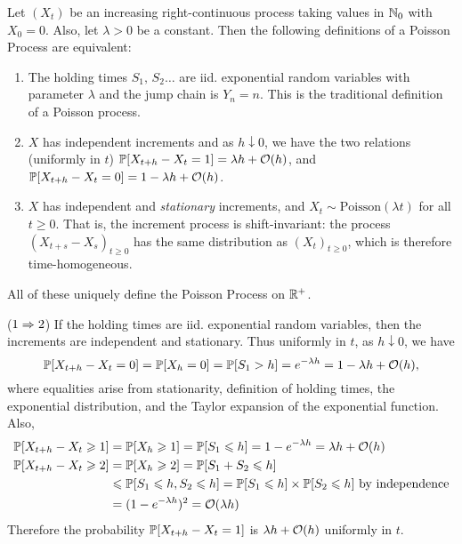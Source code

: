 \documentclass{article}
\begin{document}
\begin{theorem}
	\label{poisson-process-definitions}
    Let $(X_t)$ be an increasing right-continuous process taking values in $\N_0$ with $X_0 = 0$. Also, let $\lambda > 0$ be a constant. Then the following definitions of a Poisson Process are equivalent:
    \begin{enumerate}
    	\item The holding times $S_1, \, S_2 \dots$ are iid. exponential random variables with parameter $\lambda$ and the jump chain is $Y_n = n$. This is the traditional definition of a Poisson process.
    	\item $X$ has independent increments and as $h \downarrow 0$, we have the two relations (uniformly in $t$) $\P[X_{t+h} - X_t = 1] = \lambda h + \calO(h)$, and  $\P[X_{t+h} - X_t = 0] = 1 - \lambda h + \calO(h)$.
    	\item $X$ has independent and \textit{stationary} increments, and $X_t \sim \mathrm{Poisson}(\lambda t)$ for all $t \geq 0$. That is, the increment process is shift-invariant: the process $(X_{t+s}-X_s)_{t\geq 0}$ has the same distribution as $(X_t)_{t \geq 0}$, which is therefore time-homogeneous.
	\end{enumerate}
	All of these uniquely define the Poisson Process on $\R^+$.
\end{theorem}
\begin{prf}
    ($1 \Ra 2$) If the holding times are iid. exponential random variables, then the increments are independent and stationary. Thus uniformly in $t$, as $h \downarrow 0$, we have
    \[
	\P[X_{t+h} - X_t = 0] = \P[X_h = 0] = \P[S_1 > h] = e^{-\lambda h} = 1 - \lambda h + \calO(h),
	\]
	where equalities arise from stationarity, definition of holding times, the exponential distribution, and the Taylor expansion of the exponential function. Also,
	\begin{align*}
    	\P[X_{t+h} - X_t \geq 1] &= \P[X_h \geq 1] = \P[S_1 \leq h] = 1 - e^{-\lambda h} = \lambda h + \calO(h) \\
    	\P[X_{t+h} - X_t \geq 2] &= \P[X_h \geq 2] = \P[S_1 + S_2 \leq h] \\
    	&\leq \P[S_1 \leq h, S_2 \leq h] = \P[S_1 \leq h] \times \P[S_2 \leq h] \text{ by independence} \\
    	&= (1 - e^{-\lambda h})^2 = \calO(\lambda h)
    \end{align*}
    Therefore the probability $\P[X_{t+h} - X_t = 1]$ is $\lambda h + \calO(h)$ uniformly in $t$.
\end{prf}
\end{document}
